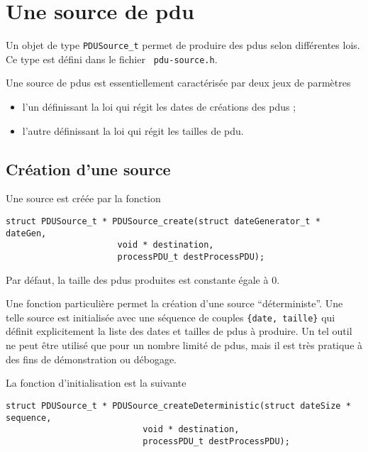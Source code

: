 %
\section{Une source de {\sc pdu}}

   Un objet de type {\tt PDUSource\_t} permet de produire des {\sc
pdu}s selon différentes lois.  Ce type est défini dans le fichier {\tt
     pdu-source.h}. 

   Une source de {\sc pdu}s est essentiellement caractérisée par deux
jeux de parmètres

\begin{itemize}
   \item l'un définissant la loi qui régit les dates de créations
     des {\sc pdu}s ;
   \item l'autre définissant la loi qui régit les tailles de {\sc
     pdu}.
\end{itemize}

%
\subsection{Création d'une source}

   Une source est créée par la fonction 

\begin{verbatim}
struct PDUSource_t * PDUSource_create(struct dateGenerator_t * dateGen,
				      void * destination,
				      processPDU_t destProcessPDU);
\end{verbatim}

   Par défaut, la taille des {\sc pdu}s produites est constante égale
à 0.

   Une fonction particulière permet la création d'une source
``déterministe''. Une telle source est initialisée avec une séquence
de couples {\tt \{date, taille\}} qui définit explicitement la liste
des dates et tailles de {\sc pdu}s à produire. Un tel outil ne peut
être utilisé que pour un nombre limité de {\sc pdu}s, mais il est très
pratique à des fins de démonstration ou débogage.

   La fonction d'initialisation est la suivante

\begin{verbatim}
struct PDUSource_t * PDUSource_createDeterministic(struct dateSize * sequence,
						   void * destination,
						   processPDU_t destProcessPDU);
\end{verbatim}

